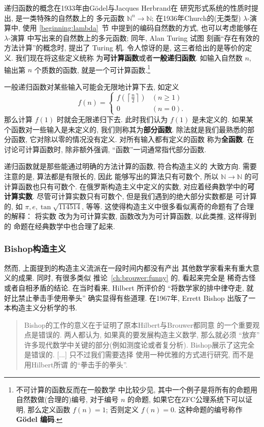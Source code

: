 \documentclass[UTF8]{ctexbook}
\theoremstyle{plain}
\theoremstyle{definition}
\theoremstyle{remark}
\begin{document}
递归函数的概念在1933年由G\"odel与Jacques Herbrand在
研究形式系统的性质时提出, 是一类特殊的自然数上的
多元函数 \(\mathbb N^n \to \mathbb N\);
在1936年Church的(无类型) \(\lambda\)-演算中, 使用 \ref{beginning:lambda}~节
中提到的编码自然数的方式, 也可以考虑能够在 \(\lambda\)-演算
中写出来的自然数上的多元函数; 同年, Alan Turing 试图
刻画“存在有效的方法计算”的概念时, 提出了 Turing 机. 令人惊讶的是,
这三者给出的是等价的定义. 我们现在将这些定义统称
为\textbf{可计算函数}或者\textbf{一般递归函数}.
如输入自然数 \(n\), 输出第 \(n\) 个质数的函数,
就是一个可计算函数.\footnote{不可计算的函数反而在一般数学
中比较少见, 其中一个例子是将所有的命题用自然数做(合理的)编号,
对于编号 \(n\) 的命题, 如果它在ZFC公理系统下可以证明,
那么定义函数 \(f(n) = 1\); 否则定义 \(f(n) = 0\).
这种命题的编号称作 \textbf{G\"odel 编码}.}

一般递归函数对某些输入可能会无限地计算下去, 如定义
\[f(n) = \begin{cases}
f\left(\left\lceil \frac n2 \right\rceil\right) & (n \ge 1)\\
0 & (n = 0).
\end{cases}\]
那么计算 \(f(1)\) 时就会无限递归下去. 此时我们认为
\(f(1)\) 是未定义的. 如果某个函数对一些输入是未定义的,
我们则称其为\textbf{部分函数}. 除法就是我们最熟悉的部分函数,
它对除以零的情况没有定义. 对所有输入都有定义的函数
称为\textbf{全函数}. 在讨论可计算函数时, 除非额外强调,
“函数”一词通常指代部分函数.

递归函数就是那些能通过明确的方法计算的函数, 符合构造主义的
大致方向. 需要注意的是, 算法都是有限长的, 因此
能够写出的算法只有可数个, 所以 \(\mathbb N \to \mathbb N\)
的可计算函数也只有可数个.
在俄罗斯构造主义中定义的实数, 对应着经典数学中的\textbf{可计算实数}.
尽管可计算实数只有可数个, 但是我们遇到的绝大部分实数都是
可计算的, 如 \(\pi, e, \tan\sqrt{114514}\), 等等.
这使得构造主义中很多看似离奇的命题有了合理的解释： 将实数
改为为可计算实数, 函数改为为可计算函数, 以此类推, 这样得到的
命题在经典数学中也合理了起来.

\subsubsection{Bishop构造主义}\label{ch:bishop}

然而, 上面提到的构造主义流派在一段时间内都没有产出
其他数学家看来有重大意义的成果. 同时, 有很多类似
推论~\ref{ch:brouwer:funny} 的, 看起来完全是
稀奇古怪或者自相矛盾的结论.
在当时看来, Hilbert 所评价的 “将数学家的排中律夺走,
就好比禁止拳击手使用拳头” 确实显得有些道理.
在1967年, Errett Bishop 出版了一本构造主义分析学的书.
\begin{quotation}
Bishop的工作的意义在于证明了原本Hilbert与Brouwer都同意
的一个重要观点是错误的. 两人都认为, 如果真的要发展构造主义数学,
那么就必须 “放弃” 许多现代数学中关键的部分(例如测度论或者复分析).
Bishop展示了这完全是错误的. [...] 只不过我们需要选择
使用一种优雅的方式进行研究, 而不是用Hilbert所谓
的“拳击手的拳头”.~\cite{beeson:1985:constructive}
\end{quotation}
\end{document}
